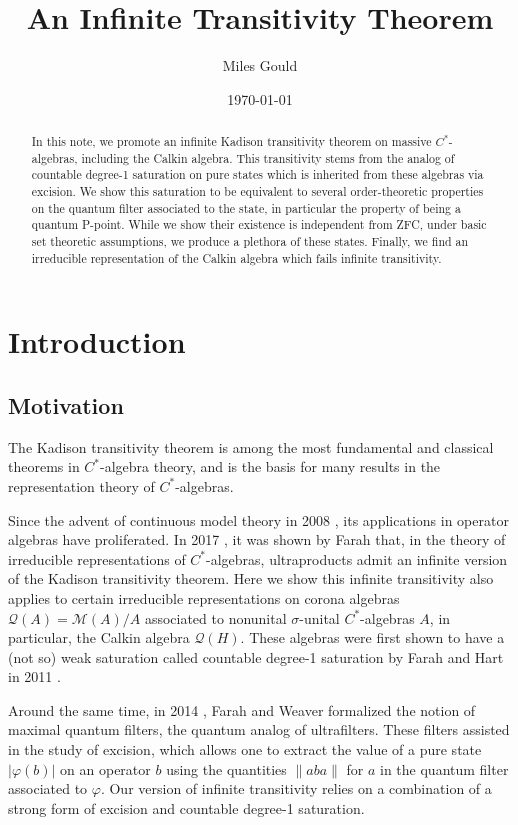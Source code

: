 \documentclass[10pt]{amsart}
\title{An Infinite Transitivity Theorem}
\author{Miles Gould}
\date{\today}
\theoremstyle{definition}
\begin{document}
\begin{abstract}
    In this note, we promote an infinite Kadison transitivity theorem on massive $C^*$-algebras, including the Calkin algebra. This transitivity stems from the analog of countable degree-1 saturation on pure states which is inherited from these algebras via excision. We show this saturation to be equivalent to several order-theoretic properties on the quantum filter associated to the state, in particular the property of being a quantum P-point. While we show their existence is independent from ZFC, under basic set theoretic assumptions, we produce a plethora of these states. Finally, we find an irreducible representation of the Calkin algebra which fails infinite transitivity.
\end{abstract}

\maketitle

\section{Introduction}

\subsection{Motivation}

The Kadison transitivity theorem is among the most fundamental and classical theorems in $C^*$-algebra theory, and is the basis for many results in the representation theory of $C^*$-algebras.

Since the advent of continuous model theory in 2008 \cite{YA08}, its applications in operator algebras have proliferated. In 2017 \cite{FA17}, it was shown by Farah that, in the theory of irreducible representations of $C^*$-algebras, ultraproducts admit an infinite version of the Kadison transitivity theorem. Here we show this infinite transitivity also applies to certain irreducible representations on corona algebras $\mathscr{Q}(A)=\mathscr{M}(A)/A$ associated to nonunital $\sigma$-unital $C^*$-algebras $A$, in particular, the Calkin algebra $\mathscr{Q}(H)$. These algebras were first shown to have a (not so) weak saturation called countable degree-1 saturation by Farah and Hart in 2011 \cite{FA11}.

Around the same time, in 2014 \cite{FA14}, Farah and Weaver formalized the notion of maximal quantum filters, the quantum analog of ultrafilters. These filters assisted in the study of excision, which allows one to extract the value of a pure state $|\varphi(b)|$ on an operator $b$ using the quantities $\|aba\|$ for $a$ in the quantum filter associated to $\varphi$. Our version of infinite transitivity relies on a combination of a strong form of excision and countable degree-1 saturation.
\end{document}
